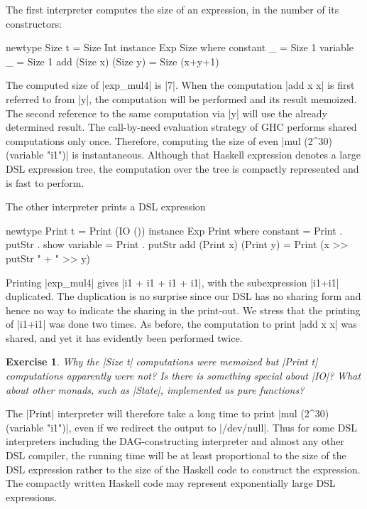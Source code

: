 \documentclass[submission,copyright,creativecommons]{eptcs}
\newtheorem{Exercise}{Exercise} \newcommand\aside[1]{}
\begin{document}
The first interpreter computes the size of an expression, in
the number of its constructors:
\begin{code}
newtype Size t = Size Int
instance Exp Size where
    constant _ = Size 1
    variable _ = Size 1
    add (Size x) (Size y) = Size (x+y+1)
\end{code}
The computed size of |exp_mul4| is |7|. When the computation |add x x|
is first referred to from |y|, the computation will be performed and
its result memoized. The second reference to the same computation via
|y| will use the already determined result. The call-by-need evaluation
strategy of GHC performs shared computations only once. Therefore,
computing the size of even |mul (2^30) (variable "i1")| is
instantaneous. Although that Haskell expression denotes a large DSL
expression tree, the computation over the tree is compactly
represented and is fast to perform.

The other interpreter prints a DSL expression
\begin{code}
newtype Print t = Print (IO ())
instance Exp Print where
    constant = Print . putStr . show 
    variable = Print . putStr
    add (Print x) (Print y) = Print (x >> putStr " + " >> y)
\end{code}
Printing |exp_mul4| gives |i1 + i1 + i1 + i1|, with the subexpression
|i1+i1| duplicated. The duplication is no surprise since our DSL has no
sharing form and hence no way to indicate the sharing in the
print-out. We stress that the printing of |i1+i1| was done
two times. As before, the computation to print |add x x| was shared, and
yet it has evidently been performed twice.
\begin{Exercise}
Why the |Size t| computations were memoized but |Print t| computations
apparently were not? Is there is something special about |IO|?
What about other monads, such as |State|, implemented
as pure functions?
\end{Exercise}
The |Print| interpreter will therefore take a long time to print
|mul (2^30) (variable "i1")|, even if we redirect
the output to |/dev/null|. Thus for some DSL interpreters
including the DAG-constructing interpreter and almost any other
DSL compiler, the running time will be at least proportional
to the size of the DSL expression rather to the size of
the Haskell code to construct the expression. The compactly written
Haskell code may represent exponentially large DSL expressions.
\end{document}
